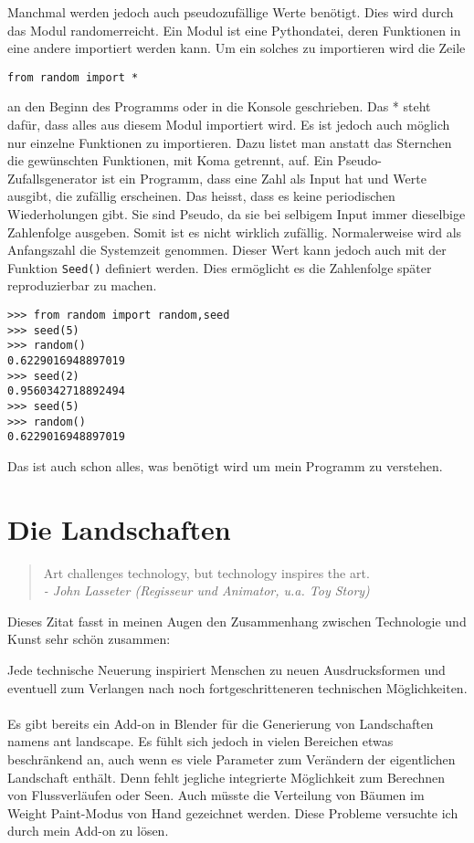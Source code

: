 \documentclass[12pt,twoside]{book}
\begin{document}
Manchmal werden jedoch auch pseudozuf\"allige Werte ben\"otigt. Dies wird durch das Modul  \glqq random\grqq{ }erreicht.
Ein Modul ist eine Pythondatei, deren Funktionen in eine andere importiert werden kann.
Um ein solches zu importieren wird die Zeile
\begin{lstlisting}
from random import *
\end{lstlisting}
an den Beginn des Programms oder in die Konsole geschrieben.
Das * steht daf\"ur, dass alles aus diesem Modul importiert wird. Es ist jedoch auch m\"oglich nur einzelne Funktionen zu importieren. Dazu listet man anstatt das Sternchen die gew\"unschten Funktionen, mit Koma getrennt, auf.
Ein Pseudo-Zufallsgenerator ist ein Programm, dass eine Zahl als Input hat und Werte ausgibt, die zuf\"allig erscheinen. Das heisst, dass es keine periodischen Wiederholungen gibt.
Sie sind Pseudo, da sie bei selbigem Input immer dieselbige Zahlenfolge ausgeben. Somit ist es nicht wirklich zuf\"allig.
Normalerweise wird als Anfangszahl die Systemzeit genommen. Dieser Wert kann jedoch auch mit der Funktion \texttt{Seed()} definiert werden. Dies erm\"oglicht es die Zahlenfolge sp\"ater reproduzierbar zu machen.
\begin{lstlisting}
>>> from random import random,seed
>>> seed(5)
>>> random()
0.6229016948897019
>>> seed(2)
0.9560342718892494
>>> seed(5)
>>> random()
0.6229016948897019
\end{lstlisting}

Das ist auch schon alles, was ben\"otigt wird um mein Programm zu verstehen.


\chapter{Die Landschaften}

\begin{quotation}
\glqq Art challenges technology, but technology inspires the art.\grqq \\ \em{- John Lasseter (Regisseur und Animator, u.a. Toy Story)} 
\end{quotation}


Dieses Zitat fasst in meinen Augen den Zusammenhang zwischen Technologie und Kunst sehr sch\"on zusammen:

Jede technische Neuerung inspiriert Menschen zu neuen Ausdrucksformen und eventuell zum Verlangen nach noch fortgeschritteneren technischen M\"oglichkeiten.
\\
\\
Es gibt bereits ein Add-on in Blender f\"ur die Generierung von Landschaften namens \glqq ant landscape\grqq .%
{ }Es f\"uhlt sich jedoch in vielen Bereichen etwas beschr\"ankend an, auch wenn es viele Parameter zum Ver\"andern der eigentlichen Landschaft enth\"alt. Denn fehlt jegliche integrierte M\"oglichkeit zum Berechnen von Flussverl\"aufen oder Seen. Auch m\"usste die Verteilung von B\"aumen im \glqq Weight Paint\grqq -Modus von Hand gezeichnet werden.
Diese Probleme versuchte ich durch mein Add-on zu l\"osen.
\end{document}
